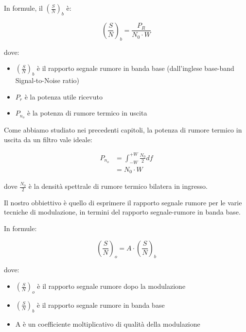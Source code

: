 In formule, il $\left( \frac{S}{N} \right)_{b}$ è: 

{
    \Large 
    \begin{equation}
        \left( \frac{S}{N} \right)_{b}
        = 
        \frac{P_R}{N_0 \cdot W}
    \end{equation}
}

dove: 

\begin{itemize}
    \item $\left( \frac{S}{N} \right)_{b}$ è il rapporto segnale rumore in banda base (dall'inglese base-band Signal-to-Noise ratio) 
    \item $P_r$ è la potenza utile ricevuto 
    \item $P_{n_o}$ è la potenza di rumore termico in uscita
\end{itemize}

Come abbiamo studiato nei precedenti capitoli, 
la potenza di rumore termico in uscita da un filtro vale ideale: 

{
    \Large 
    \begin{equation}
        \begin{split}
        P_{n_o}
        &= 
        \int_{-W}^{+W} 
        \frac{N_0}{2}
        df
        \\
        &= 
        N_0 \cdot W
        \end{split}
    \end{equation}
}

dove $\frac{N_0}{2}$ è la densità spettrale di rumore termico bilatera in ingresso. \newline 

Il nostro obbiettivo è quello di esprimere il rapporto segnale rumore per le varie tecniche di modulazione, 
in termini del rapporto segnale-rumore in banda base. \newline 

In formule: 

{
    \Large 
    \begin{equation}
       \left( \frac{S}{N} \right)_{o}
       = 
       A \cdot \left( \frac{S}{N} \right)_{b} 
    \end{equation}
}

dove: 

\begin{itemize}
    \item $\left( \frac{S}{N} \right)_{o}$ è il rapporto segnale rumore dopo la modulazione 
    \item $\left( \frac{S}{N} \right)_{b} $ è il rapporto segnale rumore in banda base 
    \item A è un coefficiente moltiplicativo di qualità della modulazione
\end{itemize}

